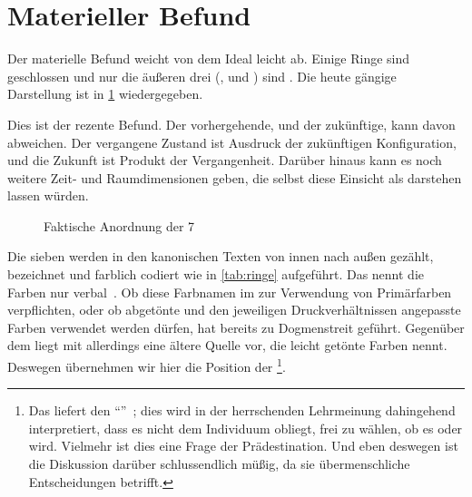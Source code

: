 \section*{Materieller Befund}

Der materielle Befund weicht von dem Ideal leicht ab. Einige Ringe sind  geschlossen und nur die äußeren drei (,  und ) sind . Die heute gängige Darstellung ist in \cref{fig:cbaselogo} wiedergegeben.

Dies ist der rezente Befund. Der vorhergehende, und der zukünftige, kann davon abweichen. Der vergangene Zustand ist Ausdruck der zukünftigen Konfiguration, und die Zukunft ist Produkt der Vergangenheit. Darüber hinaus kann es noch weitere Zeit- und Raumdimensionen geben, die selbst diese Einsicht als  darstehen lassen würden.


\begin{figure}[ht!]
    \centering
        \resizebox{0.6\textwidth}{!}{
        
    }
    \caption{Faktische Anordnung der 7 }
    \label{fig:cbaselogo}
\end{figure}


    Die sieben   werden in den kanonischen Texten von innen nach außen gezählt, bezeichnet und  farblich codiert  wie in  \cref{tab:ringe} aufgeführt. Das  nennt die Farben nur verbal~\cite[S.49]{cbasebook}. Ob diese Farbnamen im  zur Verwendung von Primärfarben verpflichten, oder ob abgetönte und den jeweiligen Druckverhältnissen angepasste Farben verwendet werden dürfen, hat bereits zu Dogmenstreit geführt. Gegenüber dem  liegt mit \cite{cbasefarbschema} allerdings eine ältere Quelle vor, die leicht getönte Farben nennt. Deswegen übernehmen wir hier die Position der \footnote{Das  liefert den  "`"'~\cite[S. 47]{cbasebook}; dies wird in der herrschenden Lehrmeinung dahingehend interpretiert, dass es nicht dem Individuum obliegt, frei zu wählen, ob es  oder  wird. Vielmehr ist dies eine Frage der Prädestination. Und eben deswegen ist die Diskussion darüber schlussendlich müßig, da sie übermenschliche Entscheidungen betrifft.}.


